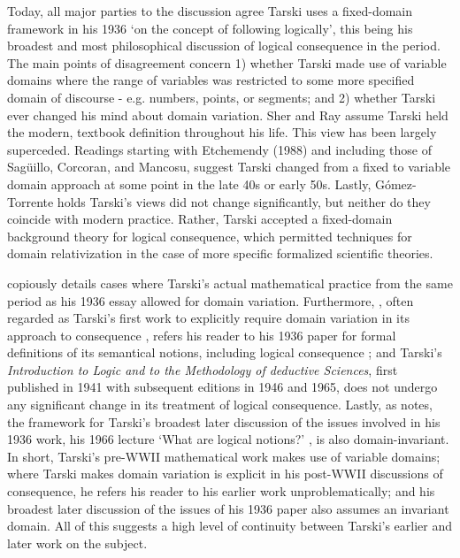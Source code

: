 \documentclass[]{article}
\begin{document}
Today, all major parties to the discussion agree Tarski uses a fixed-domain framework in his 1936 `on the concept of following logically', this being his broadest and most philosophical discussion of logical consequence in the period. The main points of disagreement concern 1) whether Tarski made use of variable domains where the range of variables was restricted to some more specified domain of discourse - e.g. numbers, points, or segments; and 2) whether Tarski ever changed his mind about domain variation. Sher and Ray assume Tarski held the modern, textbook definition throughout his life. This view has been largely superceded. Readings starting with Etchemendy (1988) and including those of Sag\"{u}illo, Corcoran, and Mancosu, suggest Tarski changed from a fixed to variable domain approach at some point in the late 40s or early 50s. Lastly,  G\'{o}mez-Torrente holds Tarski's views did not change significantly, but neither do they coincide with modern practice. Rather, Tarski accepted a fixed-domain background theory for logical consequence, which permitted techniques for domain relativization in the case of more specific formalized scientific theories.

\cite[251-267]{Gomez-Torrente2009} copiously details cases where Tarski's actual mathematical practice from the same period as his 1936 essay allowed for domain variation. Furthermore, \cite{Tarski1953a}, often regarded as Tarski's first work to explicitly require domain variation in its approach to consequence \cite[367]{Corcoran2011} \cite[65]{Etchemendy1988}, refers his reader to his 1936 paper for formal definitions of its semantical notions, including logical consequence \cite[8, n. 7]{Tarski1953a} \cite[259]{Gomez-Torrente2009}; and Tarski's  \textit{Introduction to Logic and to the Methodology of deductive Sciences}, first published in 1941 with subsequent editions in 1946 and 1965, does not undergo any significant change in its treatment of logical consequence. Lastly, as \cite[365-366]{Corcoran2011} notes, the framework for Tarski's broadest later discussion of the issues involved in his 1936 work, his 1966 lecture `What are logical notions?' \cite{Tarski1986}, is also domain-invariant. In short, Tarski's pre-WWII mathematical work makes use of variable domains; where Tarski makes domain variation is explicit in his post-WWII discussions of consequence, he refers his reader to his earlier work unproblematically; and his broadest later discussion of the issues of his 1936 paper also assumes an invariant domain. All of this suggests a high level of continuity between Tarski's earlier and later work on the subject.
\end{document}
